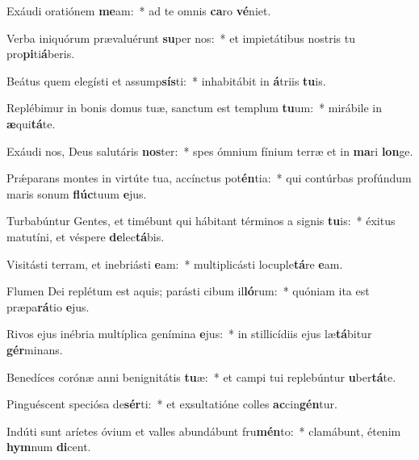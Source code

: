 \item Exáudi oratiónem \textbf{me}am:~* ad te omnis \textbf{ca}ro \textbf{vé}niet.
\item Verba iniquórum prævaluérunt \textbf{su}per nos:~* et impietátibus nostris tu pro\textbf{pi}ti\textbf{á}beris.
\item Beátus quem elegísti et assump\textbf{sís}ti:~* inhabitábit in \textbf{á}triis \textbf{tu}is.
\item Replébimur in bonis domus tuæ, sanctum est templum \textbf{tu}um:~* mirábile in \textbf{æ}qui\textbf{tá}te.
\item Exáudi nos, Deus salutáris \textbf{nos}ter:~* spes ómnium fínium terræ et in \textbf{ma}ri \textbf{lon}ge.
\item Prǽparans montes in virtúte tua, accínctus pot\textbf{én}tia:~* qui contúrbas profúndum maris sonum \textbf{flúc}tuum \textbf{e}jus.
\item Turbabúntur Gentes, et timébunt qui hábitant términos a signis \textbf{tu}is:~* éxitus matutíni, et véspere \textbf{de}lec\textbf{tá}bis.
\item Visitásti terram, et inebriásti \textbf{e}am:~* multiplicásti locuple\textbf{tá}re \textbf{e}am.
\item Flumen Dei replétum est aquis; parásti cibum il\textbf{ló}rum:~* quóniam ita est præpa\textbf{rá}tio \textbf{e}jus.
\item Rivos ejus inébria multíplica genímina \textbf{e}jus:~* in stillicídiis ejus læ\textbf{tá}bitur \textbf{gér}minans.
\item Benedíces corónæ anni benignitátis \textbf{tu}æ:~* et campi tui replebúntur \textbf{u}ber\textbf{tá}te.
\item Pinguéscent speciósa de\textbf{sér}ti:~* et exsultatióne colles \textbf{ac}cin\textbf{gén}tur.
\item Indúti sunt aríetes óvium et valles abundábunt fru\textbf{mén}to:~* clamábunt, étenim \textbf{hym}num \textbf{di}cent.
